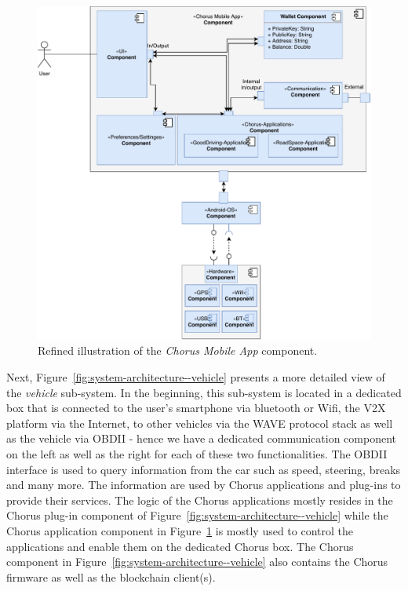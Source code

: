 \documentclass{llncs}
\begin{document}
{				\begin{figure}
					\centering
					\includegraphics[scale=0.65]{Figures/longterm-architecture/20180507_Refined-sys-architecture--mobile-app.pdf}
					\caption{Refined illustration of the \textit{Chorus Mobile App} component.}	
					\label{fig:system-architecture--app}
				\end{figure}
				Next, Figure~\ref{fig:system-architecture--vehicle} presents a more detailed view of the \textit{vehicle} sub-system. In the beginning, this sub-system is located in a dedicated box that is connected to the user's smartphone via bluetooth or Wifi, the V2X platform via the Internet, to other vehicles via the WAVE protocol stack \cite{li2010overview}\cite{uzcategui2009wave} as  well as the vehicle via OBDII - hence we have a dedicated communication component on the left as well as the right for each of these two functionalities. The OBDII interface is used to query information from the car such as speed, steering, breaks and many more. The information are used by Chorus applications and plug-ins to provide their services. The logic of the Chorus applications mostly resides in the Chorus plug-in component of Figure~\ref{fig:system-architecture--vehicle} while the Chorus application component in Figure~\ref{fig:system-architecture--app} is mostly used to control the applications and enable them on the dedicated Chorus box. The Chorus component in Figure~\ref{fig:system-architecture--vehicle} also contains the Chorus firmware as well as the blockchain client(s). 
			
}
\end{document}
